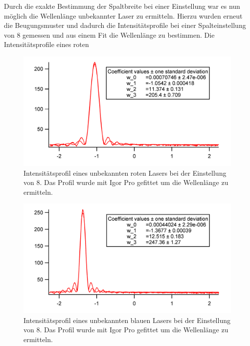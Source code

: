 Durch die exakte Bestimmung der Spaltbreite bei einer Einstellung war es nun möglich die Wellenlänge unbekannter Laser zu  ermitteln. Hierzu wurden erneut die Beugungsmuster und dadurch die Intensitätsprofile bei einer Spalteinstellung von $8$ gemessen und aus einem Fit die Wellenlänge zu bestimmen. Die Intensitätsprofile eines roten%

\begin{figure}[H]
	\centering	
	\begin{minipage}{1\textwidth}
		\includegraphics[width=\columnwidth]{180618/Graph_Rot.png}
	\end{minipage}
	\caption{Intensitätsprofil eines unbekannten roten Lasers bei der Einstellung von $8$. Das Profil wurde mit Igor Pro gefittet um die Wellenlänge zu ermitteln. }
	\label{U_Rot}
\end{figure}
\begin{figure}[H]
	\centering	
	\begin{minipage}{1\textwidth}
		\includegraphics[width=\columnwidth]{180618/Graph_Blau.png}
	\end{minipage}
	\caption{Intensitätsprofil eines unbekannten blauen Lasers bei der Einstellung von $8$. Das Profil wurde mit Igor Pro gefittet um die Wellenlänge zu ermitteln. }
	\label{U_Blau}
\end{figure}
